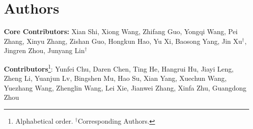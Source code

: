 \section{Authors}
\textbf{Core Contributors:} Xian Shi, Xiong Wang, Zhifang Guo, Yongqi Wang, Pei Zhang, Xinyu Zhang, Zishan Guo, Hongkun Hao, Yu Xi, Baosong Yang, Jin Xu$^{\dag}$, Jingren Zhou, Junyang Lin$^{\dag}$

\textbf{Contributors}\footnote{Alphabetical order. $^{\dag}$Corresponding Authors.}: Yunfei Chu, Daren Chen, Ting He, Hangrui Hu, Jiayi Leng, Zheng Li, Yuanjun Lv, Bingshen Mu, Hao Su, Xian Yang, Xuechun Wang, Yuezhang Wang, Zhenglin Wang, Lei Xie, Jianwei Zhang, Xinfa Zhu, Guangdong Zhou

